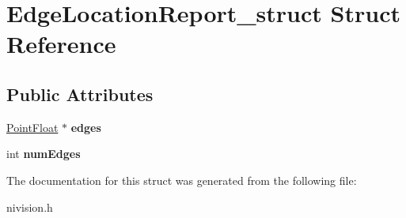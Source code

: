 \hypertarget{structEdgeLocationReport__struct}{
\section{EdgeLocationReport\_\-struct Struct Reference}
\label{structEdgeLocationReport__struct}
}
\subsection*{Public Attributes}
\begin{DoxyCompactItemize}
\item 
\hypertarget{structEdgeLocationReport__struct_aa3f03ba0b204bbd25ad238e7c74990b3}{
\hyperlink{structPointFloat__struct}{PointFloat} $\ast$ {\bfseries edges}}
\label{structEdgeLocationReport__struct_aa3f03ba0b204bbd25ad238e7c74990b3}

\item 
\hypertarget{structEdgeLocationReport__struct_a87cce8fb42e648b8baa5f62dd376f541}{
int {\bfseries numEdges}}
\label{structEdgeLocationReport__struct_a87cce8fb42e648b8baa5f62dd376f541}

\end{DoxyCompactItemize}


The documentation for this struct was generated from the following file:\begin{DoxyCompactItemize}
\item 
nivision.h\end{DoxyCompactItemize}
